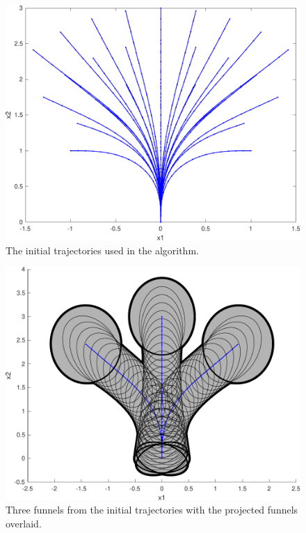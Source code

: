 \begin{figure}
  \centering \includegraphics[width=\textwidth]{figures/experiments/initial-trajectories}
  \caption{The initial trajectories used in the \rrtfunnel{} algorithm.}
  \label{fig:intial-trajectories-exp}
\end{figure}

\begin{figure}
  \centering \includegraphics[width=\textwidth]{figures/experiments/sample-funnel-overlay} \caption{Three funnels from
    the initial trajectories with the projected funnels overlaid.}
  \label{fig:sample-funnel-overlay}
\end{figure}

